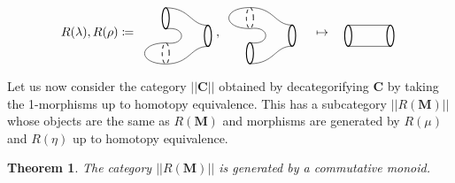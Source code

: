 \documentclass[11pt]{amsart}
\newcommand{\cat}[1]{\mathbf{#1}}
\newtheorem{thm}{Theorem}[section]
\theoremstyle{remark}
\theoremstyle{definition}
\begin{document}
%
%
%
\[
%
%
R(\lambda) , R(\rho) \coloneqq
\raisebox{-0.5\height}{%
\begin{tikzpicture}
\begin{scope}[shift={(1.2,-0.5)}]
\draw [thick]  (1.6,-0.2) ellipse (0.1 and 0.3);
\draw [thick]  (0.4,0.3) ellipse (0.1 and 0.3);
\draw [dashed] (0.4,-0.7) ellipse (0.1 and 0.3);
\draw (0.4,0) .. controls (1,0.1) and (1,-0.5) .. (0.4,-0.4);
\draw (0.4,0.6) .. controls (1.1,0.6) and (1.1,0.1) .. (1.6,0.1);
\draw (0.4,-1) .. controls (1.1,-1) and (1.1,-0.5) .. (1.6,-0.5);
\end{scope}
\begin{scope}[shift={(1.6,-1.2)}]
\draw [dashed]  (0,0) ellipse (0.1 and 0.3);
\draw (0,0.3) .. controls (-0.8,0.3) and (-0.8,-0.3) .. (0,-0.3);
\end{scope}
\end{tikzpicture}
}
%
%
%
,
%
%
\raisebox{-0.5\height}{%
\begin{tikzpicture}
\begin{scope}[shift={(1.2,-0.5)}]
\draw [thick]  (1.6,-0.2) ellipse (0.1 and 0.3);
\draw [dashed]  (0.4,0.3) ellipse (0.1 and 0.3);
\draw [thick] (0.4,-0.7) ellipse (0.1 and 0.3);
\draw (0.4,0) .. controls (1,0.1) and (1,-0.5) .. (0.4,-0.4);
\draw (0.4,0.6) .. controls (1.1,0.6) and (1.1,0.1) .. (1.6,0.1);
\draw (0.4,-1) .. controls (1.1,-1) and (1.1,-0.5) .. (1.6,-0.5);
\end{scope}
\begin{scope}[shift={(1.6,-0.2)}]
\draw [dashed]  (0,0) ellipse (0.1 and 0.3);
\draw (0,0.3) .. controls (-0.8,0.3) and (-0.8,-0.3) .. (0,-0.3);
\end{scope}
\end{tikzpicture}
}
%
%
%
\quad \mapsto \quad
%
%
\raisebox{-0.5\height}{%
\begin{tikzpicture}
\draw [thick]  (1.6,-0.2) ellipse (0.1 and 0.3);
\draw [thick] (0.4,-0.2) ellipse (0.1 and 0.3);
\draw (0.4,0.1) -- (1.6,0.1);
\draw (0.4,-0.5) -- (1.6,-0.5);
\end{tikzpicture}
}
\]

Let us now consider 
the category $|| \cat{ C } ||$ 
obtained by decategorifying 
$ \cat{ C } $ by taking the 
1-morphisms up to 
homotopy equivalence.  
This has a subcategory 
	$|| R ( \cat{ M } ) ||$ 
whose objects are the same 
as $ R ( \cat{ M } ) $ and 
morphisms are generated by 
$R ( \mu ) $ and $ R ( \eta ) $ 
up to homotopy equivalence.

\begin{thm}
	\label{thm:SyntaxMonoid}
	The category 
		$|| R ( \cat{ M } ) ||$ 
	is generated by a commutative monoid.
\end{thm}
\end{document}
